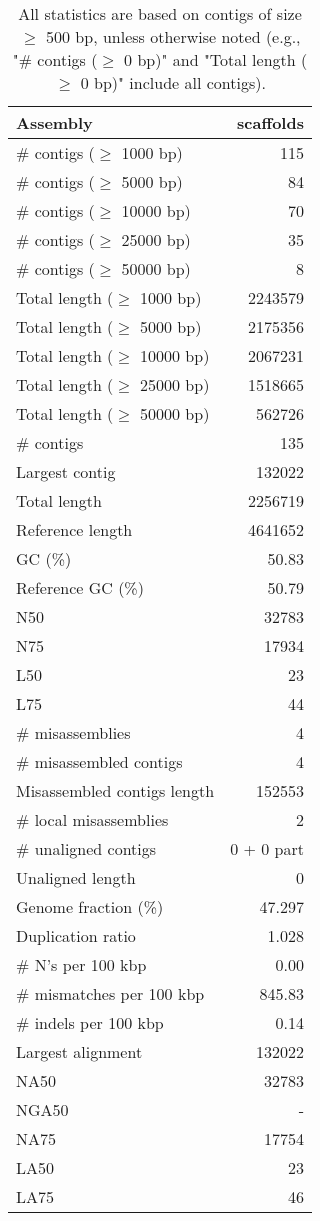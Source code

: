 \documentclass[12pt,a4paper]{article}
\begin{document}
\begin{table}[ht]
\begin{center}
\caption{All statistics are based on contigs of size $\geq$ 500 bp, unless otherwise noted (e.g., "\# contigs ($\geq$ 0 bp)" and "Total length ($\geq$ 0 bp)" include all contigs).}
\begin{tabular}{|l*{1}{|r}|}
\hline
Assembly & scaffolds \\ \hline
\# contigs ($\geq$ 1000 bp) & 115 \\ \hline
\# contigs ($\geq$ 5000 bp) & 84 \\ \hline
\# contigs ($\geq$ 10000 bp) & 70 \\ \hline
\# contigs ($\geq$ 25000 bp) & 35 \\ \hline
\# contigs ($\geq$ 50000 bp) & 8 \\ \hline
Total length ($\geq$ 1000 bp) & 2243579 \\ \hline
Total length ($\geq$ 5000 bp) & 2175356 \\ \hline
Total length ($\geq$ 10000 bp) & 2067231 \\ \hline
Total length ($\geq$ 25000 bp) & 1518665 \\ \hline
Total length ($\geq$ 50000 bp) & 562726 \\ \hline
\# contigs & 135 \\ \hline
Largest contig & 132022 \\ \hline
Total length & 2256719 \\ \hline
Reference length & 4641652 \\ \hline
GC (\%) & 50.83 \\ \hline
Reference GC (\%) & 50.79 \\ \hline
N50 & 32783 \\ \hline
N75 & 17934 \\ \hline
L50 & 23 \\ \hline
L75 & 44 \\ \hline
\# misassemblies & 4 \\ \hline
\# misassembled contigs & 4 \\ \hline
Misassembled contigs length & 152553 \\ \hline
\# local misassemblies & 2 \\ \hline
\# unaligned contigs & 0 + 0 part \\ \hline
Unaligned length & 0 \\ \hline
Genome fraction (\%) & 47.297 \\ \hline
Duplication ratio & 1.028 \\ \hline
\# N's per 100 kbp & 0.00 \\ \hline
\# mismatches per 100 kbp & 845.83 \\ \hline
\# indels per 100 kbp & 0.14 \\ \hline
Largest alignment & 132022 \\ \hline
NA50 & 32783 \\ \hline
NGA50 & - \\ \hline
NA75 & 17754 \\ \hline
LA50 & 23 \\ \hline
LA75 & 46 \\ \hline
\end{tabular}
\end{center}
\end{table}
\end{document}
